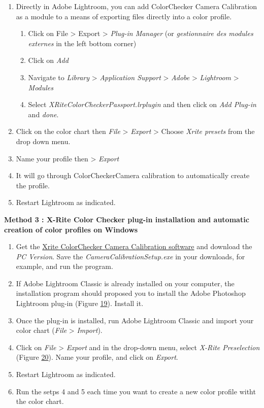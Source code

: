 \documentclass[
]{book}
\theoremstyle{definition}
\theoremstyle{definition}
\theoremstyle{definition}
\theoremstyle{definition}
\theoremstyle{remark}
\begin{document}
\begin{enumerate}
\def\labelenumi{\arabic{enumi}.}
\item
  Directly in Adobe Lightroom, you can add ColorChecker Camera
  Calibration as a module to a means of exporting files directly into
  a color profile.

  \begin{enumerate}
  \def\labelenumii{\arabic{enumii}.}
  \item
    Click on File \textgreater{} Export \textgreater{} \emph{Plug-in Manager} (or \emph{gestionnaire
    des modules externes} in the left bottom corner)
  \item
    Click on \emph{Add}
  \item
    Navigate to \emph{Library} \textgreater{} \emph{Application Support} \textgreater{} \emph{Adobe} \textgreater{}
    \emph{Lightroom} \textgreater{} \emph{Modules}
  \item
    Select \emph{XRiteColorCheckerPassport.lrplugin} and then click on
    \emph{Add Plug-in} and \emph{done}.
  \end{enumerate}
\item
  Click on the color chart then \emph{File} \textgreater{} \emph{Export} \textgreater{} Choose \emph{Xrite
  presets} from the drop down menu.
\item
  Name your profile then \textgreater{} \emph{Export}
\item
  It will go through ColorCheckerCamera calibration to automatically
  create the profile.
\item
  Restart Lightroom as indicated.
\end{enumerate}

\textbf{Method 3 : X-Rite Color Checker plug-in installation and automatic
creation of color profiles on Windows}

\begin{enumerate}
\def\labelenumi{\arabic{enumi}.}
\item
  Get the \href{https://xritephoto.com/ph_product_overview.aspx?ID=938\&Action=Support\&SoftwareID=2030}{Xrite ColorChecker Camera Calibration
  software}
  and download the \emph{PC Version}. Save the \emph{CameraCalibrationSetup.exe}
  in your downloads, for example, and run the program.
\item
  If Adobe Lightroom Classic is already installed on your computer,
  the installation program should proposed you to install the Adobe
  Photoshop Lightroom plug-in (Figure
  \protect\hyperlink{color_checker_plug_in_win}{19}). Install it.
\item
  Once the plug-in is installed, run Adobe Lightroom Classic and
  import your color chart (\emph{File} \textgreater{} \emph{Import}).
\item
  Click on \emph{File} \textgreater{} \emph{Export} and in the drop-down menu, select
  \emph{X-Rite Preselection} (Figure
  \protect\hyperlink{x_rite_preselection}{20}). Name your profile, and click on
  \emph{Export}.
\item
  Restart Lightroom as indicated.
\item
  Run the setps 4 and 5 each time you want to create a new color
  profile witht the color chart.
\end{enumerate}
\end{document}
